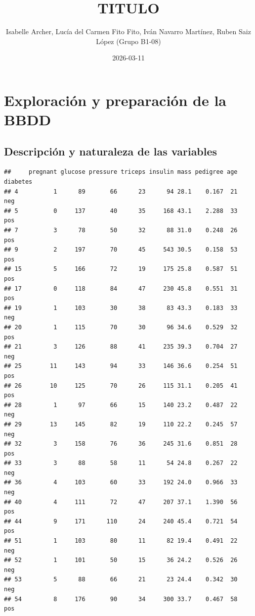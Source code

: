\documentclass[
]{article}
\title{TITULO}
\author{Isabelle Archer, Lucía del Carmen Fito Fito, Iván Navarro
Martínez, Ruben Saiz López (Grupo B1-08)}
\date{2026-03-11}
\begin{document}
\maketitle

\section{Exploración y preparación de la
BBDD}\label{exploraciuxf3n-y-preparaciuxf3n-de-la-bbdd}

\subsection{Descripción y naturaleza de las
variables}\label{descripciuxf3n-y-naturaleza-de-las-variables}

\begin{verbatim}
##     pregnant glucose pressure triceps insulin mass pedigree age diabetes
## 4          1      89       66      23      94 28.1    0.167  21      neg
## 5          0     137       40      35     168 43.1    2.288  33      pos
## 7          3      78       50      32      88 31.0    0.248  26      pos
## 9          2     197       70      45     543 30.5    0.158  53      pos
## 15         5     166       72      19     175 25.8    0.587  51      pos
## 17         0     118       84      47     230 45.8    0.551  31      pos
## 19         1     103       30      38      83 43.3    0.183  33      neg
## 20         1     115       70      30      96 34.6    0.529  32      pos
## 21         3     126       88      41     235 39.3    0.704  27      neg
## 25        11     143       94      33     146 36.6    0.254  51      pos
## 26        10     125       70      26     115 31.1    0.205  41      pos
## 28         1      97       66      15     140 23.2    0.487  22      neg
## 29        13     145       82      19     110 22.2    0.245  57      neg
## 32         3     158       76      36     245 31.6    0.851  28      pos
## 33         3      88       58      11      54 24.8    0.267  22      neg
## 36         4     103       60      33     192 24.0    0.966  33      neg
## 40         4     111       72      47     207 37.1    1.390  56      pos
## 44         9     171      110      24     240 45.4    0.721  54      pos
## 51         1     103       80      11      82 19.4    0.491  22      neg
## 52         1     101       50      15      36 24.2    0.526  26      neg
## 53         5      88       66      21      23 24.4    0.342  30      neg
## 54         8     176       90      34     300 33.7    0.467  58      pos

\end{verbatim}
\end{document}
